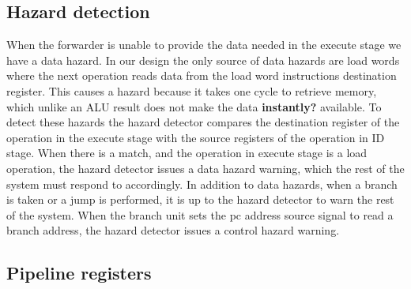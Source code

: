 \subsection{Hazard detection}
When the forwarder is unable to provide the data needed in the execute stage we have a data hazard. In our design the only source of data hazards are load words where the next operation reads data from the load word instructions destination register. 
This causes a hazard because it takes one cycle to retrieve memory, which unlike an ALU result does not make the data \textbf{instantly?} available. 
To detect these hazards the hazard detector compares the destination register of the operation in the execute stage with the source registers of the operation in ID stage.
When there is a match, and the operation in execute stage is a load operation, the hazard detector issues a data hazard warning, which the rest of the system must respond to accordingly.
In addition to data hazards, when a branch is taken or a jump is performed, it is up to the hazard detector to warn the rest of the system.
When the branch unit sets the pc address source signal to read a branch address, the hazard detector issues a control hazard warning.

\subsection{Pipeline registers}
